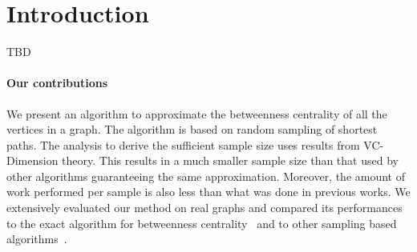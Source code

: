 \section{Introduction}\label{sec:intro}
\XXX TBD

\paragraph{Our contributions} 
We present an algorithm to approximate the betweenness centrality of all the
vertices in a graph. The algorithm is based on random sampling of shortest
paths. The analysis to derive the sufficient sample size uses results from
VC-Dimension theory. This results in a much smaller sample size than that used
by other algorithms guaranteeing the same approximation. Moreover, the amount
of work performed per sample is also less than what was done in previous works.
We extensively evaluated our method on real graphs and compared its
performances to the exact algorithm for betweenness
centrality~\citep{Brandes01} and to other sampling based
algorithms~\citep{BrandesP07,JacobKLPT05}.

